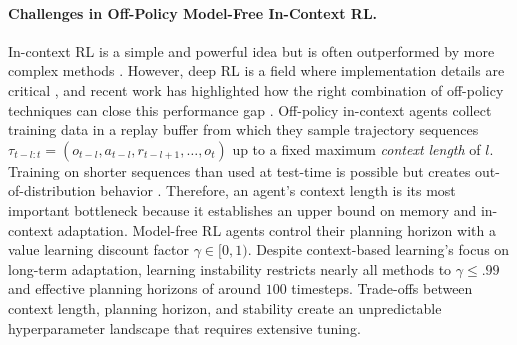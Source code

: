 \paragraph{Challenges in Off-Policy Model-Free In-Context RL.} In-context RL is a simple and powerful idea but is often outperformed by more complex methods \cite{zintgraf2021varibad, rakelly2019efficient, beck2023survey}. However, deep RL is a field where implementation details are critical \cite{henderson2018deep}, and recent work has highlighted how the right combination of off-policy techniques can close this performance gap \cite{ni2022recurrent}. Off-policy in-context agents collect training data in a replay buffer from which they sample trajectory sequences $\tau_{t-l:t} = (o_{t-l}, a_{t-l}, r_{t-l+1}, \dots, o_t)$ up to a fixed maximum \textit{context length} of $l$. Training on shorter sequences than used at test-time is possible but creates out-of-distribution behavior \cite{kapturowski2018recurrent, hausknecht2015deep, heess2015memory}. Therefore, an agent's context length is its most important bottleneck because it establishes an upper bound on memory and in-context adaptation. Model-free RL agents control their planning horizon with a value learning discount factor $\gamma \in [0, 1)$. Despite context-based learning's focus on long-term adaptation, learning instability restricts nearly all methods to $\gamma \leq .99$ and effective planning horizons of around $100$ timesteps. Trade-offs between context length, planning horizon, and stability create an unpredictable hyperparameter landscape \cite{ni2022recurrent} that requires extensive tuning.

